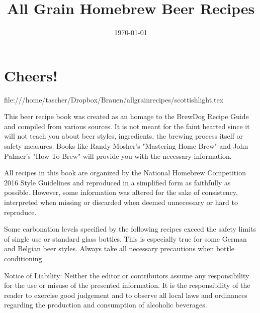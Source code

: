 \documentclass[parskip=half,fontsize=9pt,oneside,toc=chapterentrydotfill]{scrbook}
\begin{document}
\title{All Grain Homebrew Beer Recipes}
\date{\today}
\publishers{Editor: Thomas Ascher}
\dedication{Dedicated to BrauCampus Graz Hobbybrauer Stammtisch}
\maketitle

\frontmatter

\chapter*{Cheers!}
file:///home/tascher/Dropbox/Brauen/allgrainrecipes/scottishlight.tex

This beer recipe book was created as an homage to the BrewDog Recipe
Guide and compiled from various sources. It is not meant for the faint hearted
since it will not teach you about beer styles, ingredients, the brewing
process itself or safety measures. Books like Randy Mosher's "Mastering Home Brew"
and John Palmer's "How To Brew" will provide you with the necessary information.

All recipes in this book are organized by the National Homebrew Competition
2016 Style Guidelines and reproduced in a simplified form as faithfully
as possible. However, some information was altered for the sake of consistency,
interpreted when missing or discarded when deemed unnecessary or hard to reproduce.

Some carbonation levels specified by the following recipes exceed the safety
limits of single use or standard glass bottles. This is especially true for some
German and Belgian beer styles. Always take all necessary precautions when
bottle conditioning.

Notice of Liability: Neither the editor or contributors assume any responsibility
for the use or misuse of the presented information. It is the responsibility of
the reader to exercise good judgement and to observe all local laws and ordinances
regarding the production and consumption of alcoholic beverages.

\clearpage
{}
\tableofcontents

\mainmatter









\end{document}
